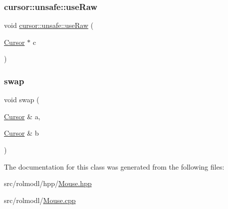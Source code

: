 \subsubsection{\texorpdfstring{cursor::unsafe::useRaw}{cursor::unsafe::useRaw}}
{\footnotesize\ttfamily void \mbox{\hyperlink{namespacerolmodl_1_1rolmodl_1_1mouse_1_1cursor_1_1unsafe_a78fca05cec154bb99bf51d0794c8c40c}{cursor\+::unsafe\+::use\+Raw}} (\begin{DoxyParamCaption}\item[{\mbox{\hyperlink{classrolmodl_1_1rolmodl_1_1mouse_1_1_cursor}{Cursor}} $\ast$}]{c }\end{DoxyParamCaption})\hspace{0.3cm}{\ttfamily [friend]}}

\mbox{\label{classrolmodl_1_1rolmodl_1_1mouse_1_1_cursor_ae60e8a45775d9c006cb05dd234e9c6b7}} 
\subsubsection{\texorpdfstring{swap}{swap}}
{\footnotesize\ttfamily void swap (\begin{DoxyParamCaption}\item[{\mbox{\hyperlink{classrolmodl_1_1rolmodl_1_1mouse_1_1_cursor}{Cursor}} \&}]{a,  }\item[{\mbox{\hyperlink{classrolmodl_1_1rolmodl_1_1mouse_1_1_cursor}{Cursor}} \&}]{b }\end{DoxyParamCaption})\hspace{0.3cm}{\ttfamily [friend]}}



The documentation for this class was generated from the following files\+:\begin{DoxyCompactItemize}
\item 
src/rolmodl/hpp/\mbox{\hyperlink{_mouse_8hpp}{Mouse.\+hpp}}\item 
src/rolmodl/\mbox{\hyperlink{_mouse_8cpp}{Mouse.\+cpp}}\end{DoxyCompactItemize}
